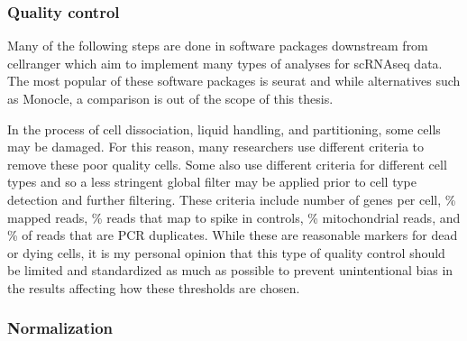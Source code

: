 \subsubsection{Quality control}

\par{
Many of the following steps are done in software packages downstream from cellranger which aim to implement many types of analyses for scRNAseq data. The most popular of these software packages is seurat\cite{seurat1}\cite{seurat2} and while alternatives such as Monocle\cite{monocle}, a comparison is out of the scope of this thesis.
} \\

\par{ In the process of cell dissociation, liquid handling, and partitioning, some cells may be damaged. For this reason, many researchers use different criteria to remove these poor quality cells. Some also use different criteria for different cell types and so a less stringent global filter may be applied prior to cell type detection and further filtering. These criteria include number of genes per cell, \% mapped reads, \% reads that map to spike in controls, \% mitochondrial reads, and \% of reads that are PCR duplicates. While these are reasonable markers for dead or dying cells\cite{osorio}\cite{ilicic}, it is my personal opinion that this type of quality control should be limited and standardized as much as possible to prevent unintentional bias in the results affecting how these thresholds are chosen. 
}

\subsubsection{Normalization}\label{section:normalize}

